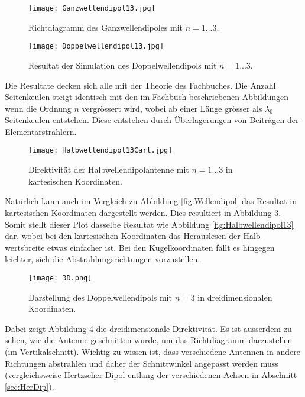 \begin{figure}[!ht]
	\centering
    \texttt{[image: Ganzwellendipol13.jpg]}
    \caption{Richtdiagramm des Ganzwellendipoles mit $n = 1 ... 3$.}
    \label{fig:Ganzwellendipol13}
\end{figure}

\newpage

\begin{figure}[!ht]
	\centering
    \texttt{[image: Doppelwellendipol13.jpg]}
    \caption{Resultat der Simulation des Doppelwellendipols mit $n = 1 ... 3$.}
    \label{fig:Doppelwellendipol13}
\end{figure}

Die Resultate decken sich alle mit der Theorie des Fachbuches. Die Anzahl Seitenkeulen steigt identisch mit den im Fachbuch beschriebenen Abbildungen wenn die Ordnung $n$ vergrössert wird, wobei ab einer Länge grösser als $\lambda_0$ Seitenkeulen entstehen. Diese entstehen durch Überlagerungen von Beiträgen der Elementarstrahlern.

\begin{figure}[!ht]
	\centering
    \texttt{[image: Halbwellendipol13Cart.jpg]}
    \caption{Direktivität der Halbwellendipolantenne mit $n = 1 ... 3$ in kartesischen Koordinaten.}
    \label{fig:Halbwellendipol13Cart}
\end{figure}

\newpage

Natürlich kann auch im Vergleich zu Abbildung \ref{fig:Wellendipol} das Resultat in kartesischen Koordinaten dargestellt werden. Dies resultiert in Abbildung \ref{fig:Halbwellendipol13Cart}. Somit stellt dieser Plot dasselbe Resultat wie Abbildung \ref{fig:Halbwellendipol13} dar, wobei bei den kartesischen Koordinaten das Herauslesen der Halb-wertsbreite etwas einfacher ist. Bei den Kugelkoordinaten fällt es hingegen leichter, sich die Abstrahlungsrichtungen vorzustellen.

\begin{figure}[!ht]
	\centering
    \texttt{[image: 3D.png]}
    \caption{Darstellung des Doppelwellendipols mit $n = 3$ in dreidimensionalen Koordinaten.}
    \label{fig:3D}
\end{figure}

Dabei zeigt Abbildung \ref{fig:3D} die dreidimensionale Direktivität. Es ist ausserdem zu sehen, wie die Antenne geschnitten wurde, um das Richtdiagramm darzustellen (im Vertikalschnitt). Wichtig zu wissen ist, dass verschiedene Antennen in andere Richtungen abstrahlen und daher der Schnittwinkel angepasst werden muss (vergleichsweise Hertzscher Dipol entlang der verschiedenen Achsen in Abschnitt \ref{sec:HerDip}).